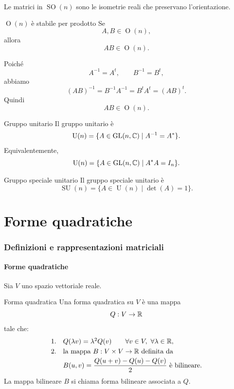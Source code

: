 \documentclass[a4paper]{article}
\begin{document}
Le matrici in \(\operatorname{SO}(n)\) sono le isometrie reali che preservano l'orientazione.

\begin{snippetproposition}{\(\operatorname{O}(n)\) è stabile per prodotto}
    Se
    \[
        A,B\in\operatorname{O}(n),
    \]
    allora
    \[
        AB\in\operatorname{O}(n).
    \]
\end{snippetproposition}

\begin{snippetproof}{}
    Poiché
    \[
        A^{-1}=A^t,
        \qquad
        B^{-1}=B^t,
    \]
    abbiamo
    \[
        (AB)^{-1}=B^{-1}A^{-1}=B^tA^t=(AB)^t.
    \]
    Quindi
    \[
        AB\in\operatorname{O}(n).
    \]
\end{snippetproof}

\begin{snippetdefinition}{Gruppo unitario}
    Il gruppo unitario è
    \[
        \operatorname{U}(n)
        =
        \{A\in\operatorname{GL}(n,\mathbb{C})\mid A^{-1}=A^*\}.
    \]
    Equivalentemente,
    \[
        \operatorname{U}(n)
        =
        \{A\in\operatorname{GL}(n,\mathbb{C})\mid A^*A=I_n\}.
    \]
\end{snippetdefinition}

\begin{snippetdefinition}{Gruppo speciale unitario}
    Il gruppo speciale unitario è
    \[
        \operatorname{SU}(n)
        =
        \{A\in\operatorname{U}(n)\mid \det(A)=1\}.
    \]
\end{snippetdefinition}

\part{Forme quadratiche}

\section{Definizioni e rappresentazioni matriciali}

\subsection{Forme quadratiche}

Sia \(V\) uno spazio vettoriale reale.

\begin{snippetdefinition}{Forma quadratica}
    Una forma quadratica su \(V\) è una mappa
    \[
        Q:V\to\mathbb{R}
    \]
    tale che:
    \[
        \begin{array}{ll}
            \text{1.} & Q(\lambda v)=\lambda^2 Q(v)
            \qquad
            \forall v\in V,\ \forall \lambda\in\mathbb{R},\\[1mm]
            \text{2.} & \text{la mappa }
            B:V\times V\to\mathbb{R}
            \text{ definita da}\\[1mm]
            &
            B(u,v)=\dfrac{Q(u+v)-Q(u)-Q(v)}{2}
            \text{ è bilineare.}
        \end{array}
    \]
    La mappa bilineare \(B\) si chiama forma bilineare associata a \(Q\).
\end{snippetdefinition}
\end{document}
